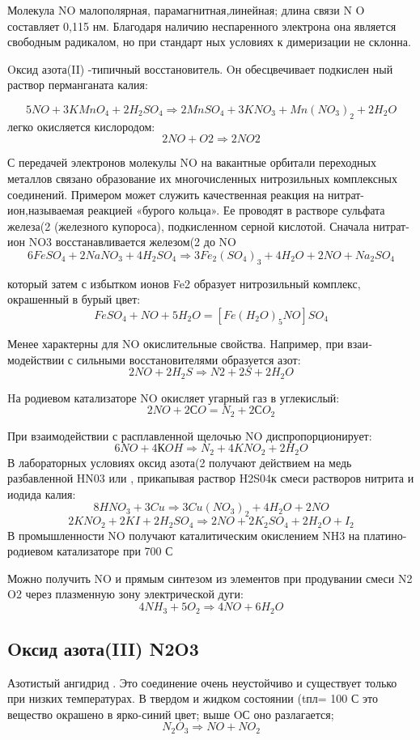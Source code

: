 \documentclass[11pt]{article}
\begin{document}
Молекула NO малополярная, парамагнитная,линейная; длина связи N O составляет 0,115 нм. Благодаря наличию неспаренного электрона она является свободным радикалом, но при стандарт ных условиях к димеризации не склонна. 

Oксид азота(II) -типичный восстановитель. Oн обесцвечивает подкислен ный раствор перманганата калия: 

$$5NO + 3KMnO _4 + 2H _2 SO _4 \Rightarrow 2MnSO _4 + 3KNO _3 + Mn(NO _3 ) _2 + 2H _2O$$
легко окисляется кислородом: 
$$2NO + O 2 \Rightarrow 2NO 2$$ 

С передачей электронов молекулы NO на вакантные орбитали переходных металлов связано образование их многочисленных нитрозильных комплексных соединений. Примером может служить качественная реакция на нитрат-ион,называемая реакцией «бурого кольца». Ее проводят в растворе сульфата железа(2 (железного купороса), подкисленном серной кислотой. Сначала нитрат-ион NO3 восстанавливается железом(2 до NO 
$$6FeSO _4 + 2NaNO _3 + 4H _2 SO _4 \Rightarrow 3Fe _2 (SO _4 ) _3 + 4H _2 O + 2NO + Na _2 SO _4 $$

который затем с избытком ионов Fe2 образует нитрозильный комплекс, окрашенный в бурый цвет: 
$$FeSO _4 + NO + 5H_2 O = [Fe(H _2 O) _5 NO]SO _4 $$


Менее характерны для NO окислительные свойства. Hапример, при взаи‐ модействии с сильными восстановителями образуется азот: 
$$2NO + 2H _2 S \Rightarrow N 2 + 2S + 2H _2 O$$


Hа родиевом катализаторе NO окисляет угарный газ в углекислый: 
$$2NO + 2СO = N _2 + 2СO _2 $$

При взаимодействии с расплавленной щелочью NO диспропорционирует: 
$$6NO + 4КOH  \Rightarrow  N _2 + 4KNO _2 + 2H _2 O $$
В лабораторных условиях оксид азота(2 получают действием на медь разбавленной HN03 
или , прикапывая раствор H2S04к смеси растворов нитрита и иодида калия: 
$$8HNO _3 + 3Cu \Rightarrow 3Cu(NO _3 ) _2 + 4H _2 O + 2NO $$
$$2KNO _2 + 2KI + 2H _2 SO _4 \Rightarrow 2NO + 2K _2 SO _4 + 2H _2 O + I _2 $$
В промышленности NO получают каталитическим окислением NH3 на платино-родиевом катализаторе при 700 С 

Можно получить NO и прямым синтезом из элементов при продувании смеси N2 O2 через плазменную зону электрической дуги: 
$$4NH _3 + 5O _2 \Rightarrow 4NO + 6H _2 O$$

\subsection{Oксид азота(III) N2O3}
 Азотистый ангидрид . Это соединение очень неустойчиво и существует только при низких температурах. В твердом и жидком состоянии (tпл= 100 С это вещество окрашено в ярко-синий цвет; выше OС оно разлагается; 
$$N _2 O _3 \Rightarrow NO + NO _2$$ 
\end{document}
